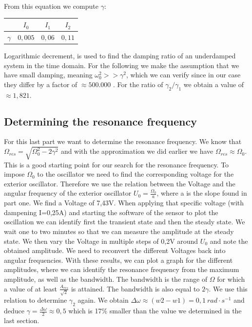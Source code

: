 \documentclass{scrartcl}
\begin{document}
From this equation we compute $\gamma$:

\centering
\begin{tabular}{|c|c|c|c|}
    \hline
     & $I_0$ & $I_1$ & $I_2$ \\
     \hline
    $\gamma$ & $0,005$ & $0,06$ & $0,11$ \\
    \hline
\end{tabular}
\flushleft

Logarithmic decrement, is used to find the damping ratio of an underdamped system in the time domain.
For the following we make the assumption that we have small damping, meaning $\omega_0^2>>\gamma^2$, which we can verify since in our case they differ by a factor of $\approx500.000$ . For the ratio of $\gamma_2 / \gamma_1$ we obtain a value of $\approx 1,821$.


\subsection{Determining the resonance frequency}

For this last part we want to determine the resonance frequency.
We know that $\Omega_{res}=\sqrt{\Omega_0^2-2\gamma^2}$ and with the approximation we did earlier we have $\Omega_{res}\approx\Omega_0$. This is a good starting point for our search for the resonance frequency. To impose $\Omega_0$ to the oscillator we need to find the corresponding voltage for the exterior oscillator. Therefore we use the relation between the Voltage and the angular frequency of the exterior oscillator $U_0=\frac{\Omega_0}{a}$, where a is the slope found in part one. We find a Voltage of 7,43V. When applying that specific voltage (with dampening I=0,25A) and starting the software of the sensor to plot the oscillation we can identify first the transient state and then the steady state. We wait one to two minutes so that we can measure the amplitude at the steady state. We then vary the Voltage in multiple steps of 0,2V around $U_0$ and note the obtained amplitude. We need to reconvert the different Voltages back into angular frequencies. With these results, we can plot a graph for the different amplitudes, where we can identify the resonance frequency from the maximum amplitude, as well as the bandwidth. The bandwidth is the range of $\Omega$ for which a value of at least $\frac{A_{res}}{\sqrt{2}}$ is attained. The bandwidth is also equal to $2\gamma$.
We use this relation to determine $\gamma_2$ again. We obtain $\Delta \omega \approx (w2-w1)=0,1 \ rad \cdot s^{-1}$ and deduce $\gamma = \frac{\Delta \omega}{2} \approx 0,5$ which is 17\% smaller than the value we determined in the last section.
\newline
\end{document}
